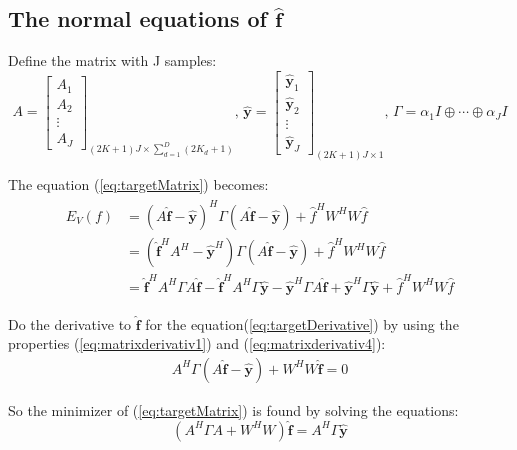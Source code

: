\documentclass[12pt]{article}
\numberwithin{equation}{section}
\begin{document}
\subsection{The normal equations of $\hat{\bm{f}}$}
Define the matrix with J samples: 
\begin{equation}
	A = 
	\begin{bmatrix}
		A_1 \\ A_2 \\ \vdots \\ A_J
	\end{bmatrix}_{(2K+1)J \times \sum^D_{d=1}(2K_d+1)}
	 \text{,   }
	\hat{\bm{y}}= 
	\begin{bmatrix}
		\hat{\bm{y}}_1 \\ \hat{\bm{y}}_2 \\ \vdots \\ \hat{\bm{y}}_J
	\end{bmatrix}_{(2K+1)J \times 1}
	 \text{,   }
	 \Gamma=\alpha_1 I  \oplus \cdots \oplus \alpha_J I
\end{equation} \par

The equation (\ref{eq:targetMatrix}) becomes:
\begin{align} \begin{split} \label{eq:targetDerivative}
	E_V(f)&=
		(A \hat{\mathbf{f}}-\hat{\mathbf{y}})^H \Gamma (A \hat{\mathbf{f}}-\hat{\mathbf{y}})
		 + \hat{f}^H W^HW \hat{f} \\
		 &= (\hat{\mathbf{f}}^H A^H - \hat{\mathbf{y}}^H)\Gamma (A \hat{\mathbf{f}}-\hat{\mathbf{y}})
		 + \hat{f}^H W^HW \hat{f} \\
		 &= \hat{\mathbf{f}}^H A^H \Gamma A \hat{\mathbf{f}} - \hat{\mathbf{f}}^H A^H \Gamma \hat{\mathbf{y}}
		 - \hat{\mathbf{y}}^H \Gamma A \hat{\mathbf{f}} + \hat{\mathbf{y}}^H \Gamma \hat{\mathbf{y}}
		 + \hat{f}^H W^HW \hat{f} 
\end{split}\end{align} \par
Do the derivative to $\hat{\bm {f}}$ for the equation(\ref{eq:targetDerivative}) by using the properties (\ref{eq:matrixderivativ1}) and (\ref{eq:matrixderivativ4}):
\begin{align}
	A^H \Gamma (A \hat{\bm{f}} - \hat{\bm{y}})  
	+ W^HW\hat{\bm{f}} = 0
\end{align} \par
So the minimizer of (\ref{eq:targetMatrix}) is found by solving the equations:
\begin{equation} \label{eq:ccot}
	(A^H \Gamma A + W^H W) \hat{\bm{f}} = A^H \Gamma \hat{\bm{y}}
\end{equation}
\end{document}
